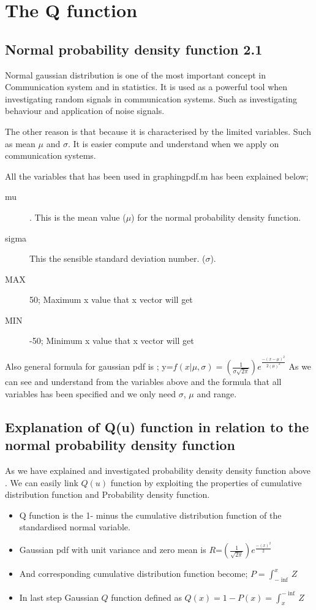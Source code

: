\section{The Q function}

\subsection{Normal probability density function 2.1}
Normal gaussian distribution is one of the most important concept in Communication system and in statistics. It is used as a powerful tool when investigating random signals in communication systems.  Such as investigating behaviour and application of noise signals.

The other reason is that because it is characterised by the limited variables. Such as mean $\mu$ and $\sigma$. It is easier compute and understand when we apply on communication systems.

All the variables that has been used in graphingpdf.m has been explained below;

\begin{description}
	\item [mu] . This is the mean value ($\mu$) for the normal probability density function.
	\item [sigma] This the sensible standard deviation number. ($\sigma$).
	\item [MAX] 50; Maximum x value that x vector will get 
	\item [MIN] -50; Minimum x value that x vector will get
\end{description}

Also general formula for gaussian pdf is ;
y=$f(x|\mu,\sigma)=(\frac{1}{\sigma \sqrt{2 \pi}}) e^{\frac{-(x-\mu)^2}{2(\mu)^2}}$
As we can see and understand from the variables above and the formula that all variables has been specified and we only need $\sigma$, $\mu$ and range.

\subsection{Explanation of Q(u) function in relation to the normal probability density function }
As we have explained and investigated probability density density function above . We can easily link $Q(u)$ function by exploiting the properties of cumulative distribution function and Probability density function.
\begin{itemize}
	\item Q function is the 1- minus the cumulative distribution function of the standardised normal variable.
	\item Gaussian pdf with unit variance and zero mean is $R$=$(\frac{1}{\sqrt{2 \pi}}) e^{\frac{-(x)^2}{2}}$
	\item And corresponding cumulative distribution function become; $P=\int_{-\inf}^{x} Z$
	\item In last step Gaussian $Q$ function defined as $Q(x)=1-P(x)=\int_{x}^{-\inf} Z$
\end{itemize}
